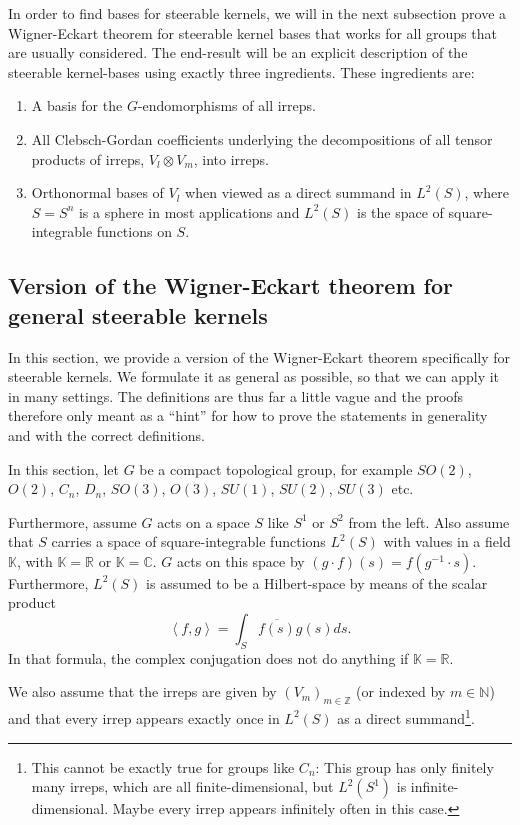 \documentclass[12pt, a4paper]{article}
\theoremstyle{plain}
\theoremstyle{definition}
\theoremstyle{remark}
\newcommand{\N}{\mathds{N}}
\newcommand{\Z}{\mathds{Z}}
\newcommand{\R}{\mathds{R}}
\newcommand{\C}{\mathds{C}}
\newcommand{\K}{\mathds{K}}
\begin{document}
In order to find bases for steerable kernels, we will in the next subsection prove a Wigner-Eckart theorem for steerable kernel bases that works for all groups that are usually considered. The end-result will be an explicit description of the steerable kernel-bases using exactly three ingredients. These ingredients are:

\begin{enumerate}
\item A basis for the $G$-endomorphisms of all irreps.
\item All Clebsch-Gordan coefficients underlying the decompositions of all tensor products of irreps, $V_l \otimes V_m$, into irreps.
\item Orthonormal bases of $V_l$ when viewed as a direct summand in $L^2(S)$, where $S = S^n$ is a sphere in most applications and $L^2(S)$ is the space of square-integrable functions on $S$.
\end{enumerate}

\subsection{Version of the Wigner-Eckart theorem for general steerable kernels}\label{general_wigner_eckart}

In this section, we provide a version of the Wigner-Eckart theorem specifically for steerable kernels. We formulate it as general as possible, so that we can apply it in many settings. The definitions are thus far a little vague and the proofs therefore only meant as a ``hint'' for how to prove the statements in generality and with the correct definitions. 

In this section, let $G$ be a compact topological group, for example $SO(2)$, $O(2)$, $C_n$, $D_n$, $SO(3)$, $O(3)$, $SU(1)$, $SU(2)$, $SU(3)$ etc.

Furthermore, assume $G$ acts on a space $S$ like $S^1$ or $S^2$ from the left. Also assume that $S$ carries a space of square-integrable functions $L^2(S)$ with values in a field $\K$, with $\K = \R$ or $\K = \C$. $G$ acts on this space by $(g \cdot f)(s) = f(g^{-1} \cdot s)$. Furthermore, $L^2(S)$ is assumed to be a Hilbert-space by means of the scalar product
\begin{equation*}
\left\langle f, g \right\rangle = \int_{S} \overline{f(s)} g(s) ds.
\end{equation*}
In that formula, the complex conjugation does not do anything if $\K = \R$. 

We also assume that the irreps are given by $(V_m)_{m \in \Z}$ (or indexed by $m \in \N$) and that every irrep appears exactly once in $L^2(S)$ as a direct summand\footnote{This cannot be exactly true for groups like $C_n$: This group has only finitely many irreps, which are all finite-dimensional, but $L^2(S^1)$ is infinite-dimensional. Maybe every irrep appears infinitely often in this case.}. 
\end{document}
